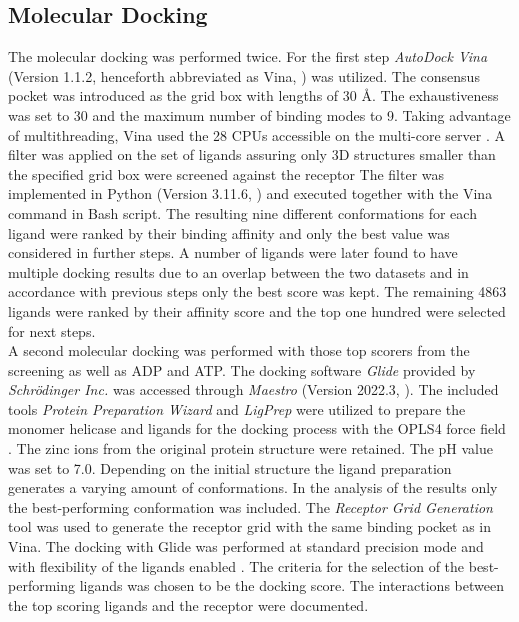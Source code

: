 \documentclass[11pt, letterpaper, titlepage]{article}
\renewcommand{\cite}{\parencite}
\begin{document}
\subsection{Molecular Docking}
The molecular docking was performed twice. 
For the first step \textit{AutoDock Vina} (Version 1.1.2, henceforth abbreviated as Vina, \textcite{Trott.2010}) was utilized. 
The consensus pocket was introduced as the grid box with lengths of 30 \AA. The exhaustiveness was set to 30 and the maximum number of binding modes to 9. Taking advantage of multithreading, \ac{Vina} used the 28 CPUs accessible on the multi-core server \cite{Che2023}. A filter was applied on the set of ligands assuring only 3D structures smaller than the specified grid box were screened against the receptor 
The filter was implemented in Python (Version 3.11.6, \textcite{Python}) and executed together with the Vina command in Bash script. The resulting nine different conformations for each ligand were ranked by their binding affinity and only the best value was considered in further steps. A number of ligands were later found to have multiple docking results due to an overlap between the two datasets and in accordance with previous steps only the best score was kept. The remaining 4863 ligands were ranked by their affinity score and the top one hundred were selected for next steps. \\
A second molecular docking was performed with those top scorers from the screening as well as \ac{ADP} and \ac{ATP}. The docking software \textit{Glide} provided by \textit{Schrödinger Inc.} \cite{Friesner2004} was accessed through \textit{Maestro} (Version 2022.3, \textcite{Maestro2022}). The included tools \textit{Protein Preparation Wizard} and \textit{LigPrep} \cite{Madhavi2013} were utilized to prepare the monomer helicase and ligands for the docking process with the OPLS4 force field \cite{Lu2021}. The zinc ions from the original protein structure were retained. The pH value was set to 7.0. Depending on the initial structure the ligand preparation generates a varying amount of conformations. In the analysis of the results only the best-performing conformation was included. The \textit{Receptor Grid Generation} tool was used to generate the receptor grid with the same binding pocket as in Vina. The docking with Glide was performed at standard precision mode and with flexibility of the ligands enabled \cite{Halgren.2004}. The criteria for the selection of the best-performing ligands was chosen to be the docking score. The interactions between the top scoring ligands and the receptor were documented. 
\end{document}
